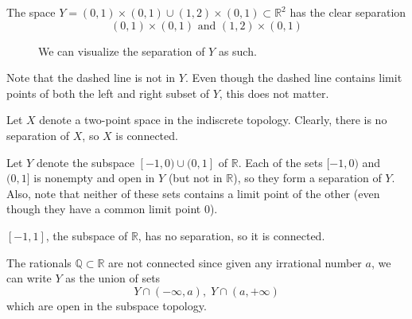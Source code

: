     \begin{example}
      The space $Y = (0,1) \times (0,1) \cup (1,2) \times (0,1) \subset \mathbb{R}^2$ has the clear separation 
      \begin{equation}
        (0, 1) \times (0, 1) \text{ and } (1, 2) \times (0, 1)
      \end{equation}

      \begin{figure}[H]
        \centering 
        \caption{We can visualize the separation of $Y$ as such. } 
        \label{fig:separation_of_rectangle}
      \end{figure}
      Note that the dashed line is not in $Y$. Even though the dashed line contains limit points of both the left and right subset of $Y$, this does not matter. 
    \end{example}

    \begin{example}
      Let $X$ denote a two-point space in the indiscrete topology. Clearly, there is no separation of $X$, so $X$ is connected. 
    \end{example}

    \begin{example}
      Let $Y$ denote the subspace $[-1,0) \cup (0,1]$ of $\mathbb{R}$. Each of the sets $[-1,0)$ and $(0,1]$ is nonempty and open in $Y$ (but not in $\mathbb{R}$), so they form a separation of $Y$. Also, note that neither of these sets contains a limit point of the other (even though they have a common limit point $0$). 
    \end{example}

    \begin{example}
      $[-1,1]$, the subspace of $\mathbb{R}$, has no separation, so it is connected. 
    \end{example}

    \begin{example}
      The rationals $\mathbb{Q} \subset \mathbb{R}$ are not connected since given any irrational number $a$, we can write $Y$ as the union of sets
      \begin{equation}
        Y \cap (-\infty, a), \; Y \cap (a, +\infty)
      \end{equation}
      which are open in the subspace topology. 
    \end{example}

